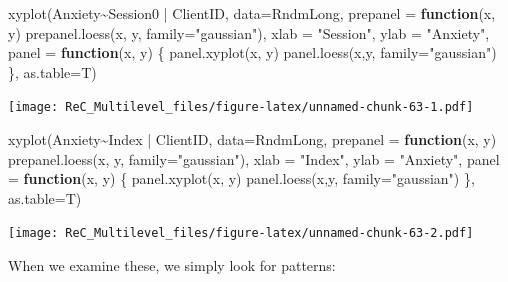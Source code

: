 \documentclass[
  11pt,
]{book}
\newenvironment{Shaded}{\begin{snugshade}}{\end{snugshade}}
\newcommand{\AttributeTok}[1]{\textcolor[rgb]{0.77,0.63,0.00}{#1}}
\newcommand{\ControlFlowTok}[1]{\textcolor[rgb]{0.13,0.29,0.53}{\textbf{#1}}}
\newcommand{\FunctionTok}[1]{\textcolor[rgb]{0.00,0.00,0.00}{#1}}
\newcommand{\NormalTok}[1]{#1}
\newcommand{\SpecialCharTok}[1]{\textcolor[rgb]{0.00,0.00,0.00}{#1}}
\newcommand{\StringTok}[1]{\textcolor[rgb]{0.31,0.60,0.02}{#1}}
\begin{document}
\begin{Shaded}
\begin{Highlighting}[]
\FunctionTok{xyplot}\NormalTok{(Anxiety}\SpecialCharTok{\textasciitilde{}}\NormalTok{Session0 }\SpecialCharTok{|}\NormalTok{ ClientID, }\AttributeTok{data=}\NormalTok{RndmLong,}
  \AttributeTok{prepanel =} \ControlFlowTok{function}\NormalTok{(x, y) }\FunctionTok{prepanel.loess}\NormalTok{(x, y, }\AttributeTok{family=}\StringTok{"gaussian"}\NormalTok{),}
  \AttributeTok{xlab =} \StringTok{"Session"}\NormalTok{, }\AttributeTok{ylab =} \StringTok{"Anxiety"}\NormalTok{,}
  \AttributeTok{panel =} \ControlFlowTok{function}\NormalTok{(x, y) \{}
  \FunctionTok{panel.xyplot}\NormalTok{(x, y)}
  \FunctionTok{panel.loess}\NormalTok{(x,y, }\AttributeTok{family=}\StringTok{"gaussian"}\NormalTok{) \},}
   \AttributeTok{as.table=}\NormalTok{T)}
\end{Highlighting}
\end{Shaded}

\texttt{[image: ReC\_Multilevel\_files/figure-latex/unnamed-chunk-63-1.pdf]}

\begin{Shaded}
\begin{Highlighting}[]
\FunctionTok{xyplot}\NormalTok{(Anxiety}\SpecialCharTok{\textasciitilde{}}\NormalTok{Index }\SpecialCharTok{|}\NormalTok{ ClientID, }\AttributeTok{data=}\NormalTok{RndmLong,}
  \AttributeTok{prepanel =} \ControlFlowTok{function}\NormalTok{(x, y) }\FunctionTok{prepanel.loess}\NormalTok{(x, y, }\AttributeTok{family=}\StringTok{"gaussian"}\NormalTok{),}
  \AttributeTok{xlab =} \StringTok{"Index"}\NormalTok{, }\AttributeTok{ylab =} \StringTok{"Anxiety"}\NormalTok{,}
  \AttributeTok{panel =} \ControlFlowTok{function}\NormalTok{(x, y) \{}
  \FunctionTok{panel.xyplot}\NormalTok{(x, y)}
  \FunctionTok{panel.loess}\NormalTok{(x,y, }\AttributeTok{family=}\StringTok{"gaussian"}\NormalTok{) \},}
   \AttributeTok{as.table=}\NormalTok{T)}
\end{Highlighting}
\end{Shaded}

\texttt{[image: ReC\_Multilevel\_files/figure-latex/unnamed-chunk-63-2.pdf]}

When we examine these, we simply look for patterns:
\end{document}
